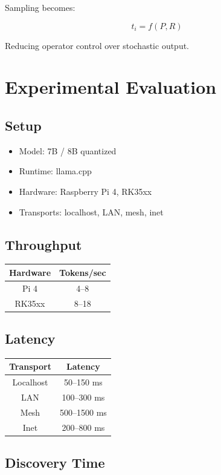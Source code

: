\documentclass[11pt]{article}
\begin{document}
Sampling becomes:

\[
t_i = f(P, R)
\]

Reducing operator control over stochastic output.

\section{Experimental Evaluation}

\subsection{Setup}

\begin{itemize}
    \item Model: 7B / 8B quantized
    \item Runtime: llama.cpp
    \item Hardware: Raspberry Pi 4, RK35xx
    \item Transports: localhost, LAN, mesh, inet
\end{itemize}

\subsection{Throughput}

\begin{tabular}{|c|c|}
\hline
Hardware & Tokens/sec \\
\hline
Pi 4 & 4--8 \\
RK35xx & 8--18 \\
\hline
\end{tabular}

\subsection{Latency}

\begin{tabular}{|c|c|}
\hline
Transport & Latency \\
\hline
Localhost & 50--150 ms \\
LAN & 100--300 ms \\
Mesh & 500--1500 ms \\
Inet & 200--800 ms \\
\hline
\end{tabular}

\subsection{Discovery Time}
\end{document}
